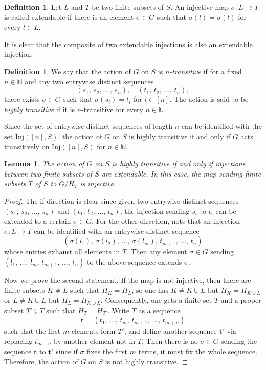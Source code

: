 \documentclass[11pt, reqno]{amsart}
\theoremstyle{plain}
\newtheorem{lemma}[theorem]{Lemma}
\numberwithin{equation}{section}
\theoremstyle{definition}
\newtheorem{definition}[theorem]{Definition}
\newcommand{\Inj}{{\mathrm{Inj}}}
\begin{document}
\begin{definition}
Let $L$ and $T$ be two finite subsets of $S$. An injective map $\sigma: L \to T$ is called extendable if there is an element $\tilde{\sigma} \in G$ such that $\sigma(l) = \tilde{\sigma}(l)$ for every $l \in L$.
\end{definition}

It is clear that the composite of two extendable injections is also an extendable injection.

\begin{definition} \cite[Definition 3.11]{BMMN}
We say that the action of $G$ on $S$ is \textit{$n$-transitive} if for a fixed $n \in \mathbb{N}$ and any two entrywise distinct sequences
\[
(s_1, \, s_2, \, \ldots, \, s_n), \quad (t_1, \, t_2, \, \ldots, \, t_n),
\]
there exists $\sigma \in G$ such that $\sigma(s_i) = t_i$ for $i \in [n]$. The action is said to be \textit{highly transitive} if it is $n$-transitive for every $n \in \mathbb{N}$.
\end{definition}

Since the set of entrywise distinct sequences of length $n$ can be identified with the set $\Inj([n], S)$, the action of $G$ on $S$ is highly transitive if and only if $G$ acts transitively on $\Inj([n], S)$ for $n \in \mathbb{N}$.

\begin{lemma} \label{extendable maps}
The action of $G$ on $S$ is highly transitive if and only if injections between two finite subsets of $S$ are extendable. In this case, the map sending finite subsets $T$ of $S$ to $G/H_T$ is injective.
\end{lemma}

\begin{proof}
The if direction is clear since given two entrywise distinct sequences $(s_1, \, s_2, \, \ldots, \, s_n)$ and $(t_1, \, t_2, \, \ldots, \, t_n)$, the injection sending $s_i$ to $t_i$ can be extended to a certain $\sigma \in G$. For the other direction, note that an injection $\sigma: L \to T$ can be identified with an entrywise distinct sequence
\[
(\sigma(l_1), \, \sigma(l_2), \, \ldots, \, \sigma(l_m), \, t_{m+1}, \, \ldots, \, t_n)
\]
whose entries exhaust all elements in $T$. Then any element $\tilde{\sigma} \in G$ sending $(l_1, \, \ldots, \, l_m, \, t_{m+1}, \, \ldots, \, t_n)$ to the above sequence extends $\sigma$.

Now we prove the second statement. If the map is not injective, then there are finite subsets $K \neq L$ such that $H_K = H_L$, so one has $K \neq K \cup L$ but $H_K = H_{K \cup L}$ or $L \neq K \cup L$ but $H_L = H_{K \cup L}$. Consequently, one gets a finite set $T$ and a proper subset $T' \subsetneqq T$ such that $H_T = H_{T'}$. Write $T$ as a sequence
\[
\mathbf{t} = (t_1, \, \ldots, \, t_m, \, t_{m+1}, \, \ldots, \, t_{m+n})
\]
such that the first $m$ elements form $T'$, and define another sequence $\mathbf{t}'$ via replacing $t_{m+n}$ by another element not in $T$. Then there is no $\sigma \in G$ sending the sequence $\mathbf{t}$ to $\mathbf{t}'$ since if $\sigma$ fixes the first $m$ terms, it must fix the whole sequence. Therefore, the action of $G$ on $S$ is not highly transitive.
\end{proof}
\end{document}
